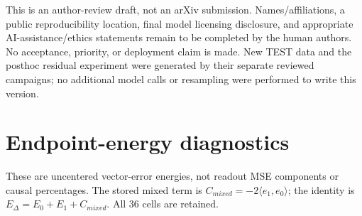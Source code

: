 This is an author-review draft, not an arXiv submission. Names/affiliations, a public reproducibility location, final model licensing disclosure, and appropriate AI-assistance/ethics statements remain to be completed by the human authors. No acceptance, priority, or deployment claim is made. New TEST data and the posthoc residual experiment were generated by their separate reviewed campaigns; no additional model calls or resampling were performed to write this version.

\clearpage

\clearpage

\clearpage
\clearpage
\section{Endpoint-energy diagnostics}\label{app:endpoint}
These are uncentered vector-error energies, not readout MSE components or causal percentages. The stored mixed term is $C_{mixed}=-2\langle e_1,e_0\rangle$; the identity is $E_\Delta=E_0+E_1+C_{mixed}$. All 36 cells are retained.

